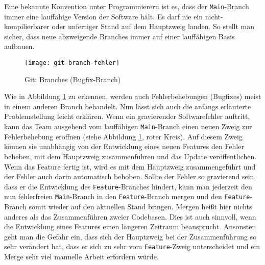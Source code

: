 Eine bekannte Konvention unter Programmierern ist es, dass der
\texttt{Main}-Branch immer eine lauffähige Version der Software hält. Es darf
nie ein nicht-kompilierbarer oder unfertiger Stand auf dem Hauptzweig landen.
So stellt man sicher, dass neue abzweigende Branches immer auf einer
lauffähigen Basis aufbauen.

\begin{figure}[H]
    \centering
    \texttt{[image: git-branch-fehler]}
    \caption{Git: Branches (Bugfix-Branch)}
    \label{fig:git-branch-fehler}
\end{figure}

Wie in Abbildung \ref{fig:git-branch-fehler} zu erkennen, werden auch
Fehlerbehebungen (Bugfixes) meist in einem anderen Branch behandelt. Nun lässt
sich auch die anfangs erläuterte Problemstellung leicht erklären. Wenn ein 
gravierender Softwarefehler auftritt, kann das Team ausgehend vom lauffähigen
\texttt{Main}-Branch einen neuen Zweig zur Fehlerbehebung eröffnen (siehe
Abbildung \ref{fig:git-branch-fehler}, roter Kreis). Auf diesem Zweig können sie
unabhängig von der Entwicklung eines neuen Features den Fehler beheben, mit dem
Hauptzweig zusammenführen und das Update veröffentlichen. Wenn das Feature
fertig ist, wird es mit dem Hauptzweig zusammengeführt und der Fehler auch darin
automatisch behoben. Sollte der Fehler so gravierend sein, dass er die
Entwicklung des \texttt{Feature}-Branches hindert, kann man jederzeit den nun
fehlerfreien \texttt{Main}-Branch in den \texttt{Feature}-Branch mergen und den
\texttt{Feature}-Branch somit wieder auf den aktuellen Stand bringen. Mergen
heißt hier nichts anderes als das Zusammenführen zweier Codebasen. Dies ist auch
sinnvoll, wenn die Entwicklung eines Features einen längeren Zeitraum
beansprucht. Ansonsten geht man die Gefahr ein, dass sich der Hauptzweig bei der
Zusammenführung so sehr verändert hat, dass er sich zu sehr vom
\texttt{Feature}-Zweig unterscheidet und ein Merge sehr viel manuelle Arbeit
erfordern würde.
